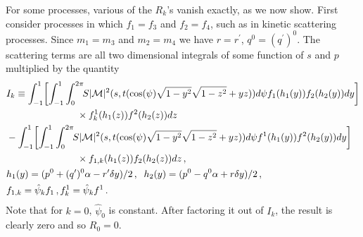 For some processes, various of the $R_k$'s vanish exactly, as we now show. First consider processes in which $f_1=f_3$ and $f_2=f_4$, such as in kinetic scattering processes. Since $m_1=m_3$ and $m_2=m_4$ we have $r=r^{\prime}$, $q^0=(q^{\prime})^0$.  The scattering terms are all two dimensional integrals of some function of $s$ and $p$ multiplied by the quantity
\begin{align}
&I_k
\equiv\int_{-1}^1\! \left[\int_{-1}^1\int_0^{2\pi}\!\!S|\mathcal{M}|^2 (s,t(\cos(\psi)\sqrt{1-y^2}\sqrt{1-z^2}+yz))d\psi f_1(h_1(y))f_2(h_2(y)) dy\right]\\
&\hspace{26mm}\times f_k^1(h_1(z))f^2(h_2(z))dz\notag\\
&-\int_{-1}^1 \!\left[\int_{-1}^1\int_0^{2\pi}\!\!S|\mathcal{M}|^2 (s,t(\cos(\psi)\sqrt{1-y^2}\sqrt{1-z^2}+yz))d\psi f^1(h_1(y))f^2(h_2(y)) dy\right] \notag\\
&\hspace{26mm}\times f_{1,k}(h_1(z))f_2(h_2(z))dz\,,\notag\\
&h_1(y)=(p^0+(q^{\prime})^0\alpha-r^{\prime}\delta y)/2\,,\hspace{2mm} h_2(y)=(p^0-q^0\alpha+r\delta y)/2\,,\notag\\
&f_{1,k}=\hat\psi_k f_1\,, f^1_k=\hat\psi_k f^1\,.\notag
\end{align}
Note that for $k=0$, $\hat\psi_0$ is constant.  After factoring it out of $I_k$, the result is clearly zero and so $R_0=0$.  

